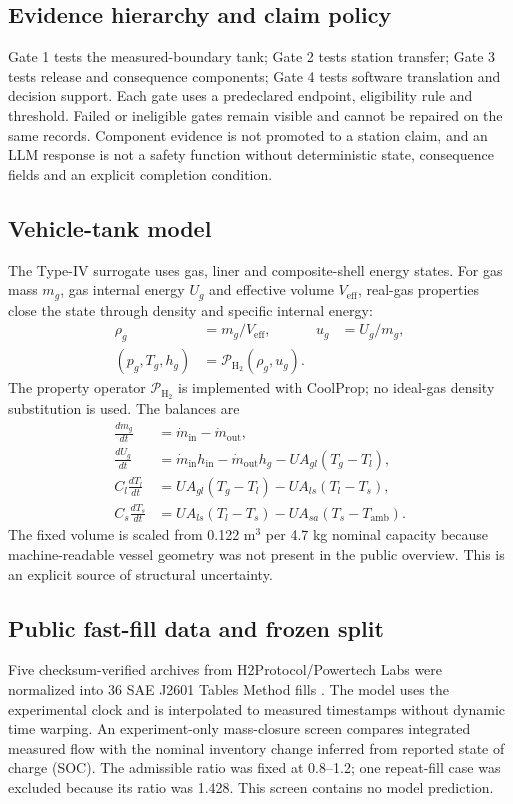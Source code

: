\documentclass[12pt,a4paper]{article}
\begin{document}
\subsection{Evidence hierarchy and claim policy}
Gate 1 tests the measured-boundary tank; Gate 2 tests station transfer; Gate 3
tests release and consequence components; Gate 4 tests software translation and
decision support. Each gate uses a predeclared endpoint, eligibility rule and
threshold. Failed or ineligible gates remain visible and cannot be repaired on
the same records. Component evidence is not promoted to a station claim, and an
LLM response is not a safety function without deterministic state, consequence
fields and an explicit completion condition.

\subsection{Vehicle-tank model}
The Type-IV surrogate uses gas, liner and composite-shell energy states. For gas
mass $m_g$, gas internal energy $U_g$ and effective volume $V_{\mathrm{eff}}$,
real-gas properties close the state through density and specific internal energy:
\begin{align}
 \rho_g &= m_g/V_{\mathrm{eff}}, & u_g &= U_g/m_g,\\
 (p_g,T_g,h_g) &= \mathcal{P}_{\mathrm{H_2}}(\rho_g,u_g).
\end{align}
The property operator $\mathcal{P}_{\mathrm{H_2}}$ is implemented with CoolProp;
no ideal-gas density substitution is used. The balances are
\begin{align}
 \frac{dm_g}{dt} &= \dot m_{\mathrm{in}}-\dot m_{\mathrm{out}},\\
 \frac{dU_g}{dt} &= \dot m_{\mathrm{in}}h_{\mathrm{in}}
 -\dot m_{\mathrm{out}}h_g-UA_{gl}(T_g-T_l),\\
 C_l\frac{dT_l}{dt} &= UA_{gl}(T_g-T_l)-UA_{ls}(T_l-T_s),\\
 C_s\frac{dT_s}{dt} &= UA_{ls}(T_l-T_s)-UA_{sa}(T_s-T_{\mathrm{amb}}).
\end{align}
The fixed volume is scaled from 0.122 m$^3$ per 4.7 kg nominal capacity because
machine-readable vessel geometry was not present in the public overview. This is
an explicit source of structural uncertainty.

\subsection{Public fast-fill data and frozen split}
Five checksum-verified archives from H2Protocol/Powertech Labs were normalized
into 36 SAE J2601 Tables Method fills \cite{schneider2014}. The model uses the
experimental clock and is interpolated to measured timestamps without dynamic
time warping. An experiment-only mass-closure screen compares integrated measured
flow with the nominal inventory change inferred from reported state of charge
(SOC). The admissible ratio was fixed at 0.8--1.2; one repeat-fill case was
excluded because its ratio was 1.428. This screen contains no model prediction.
\end{document}
